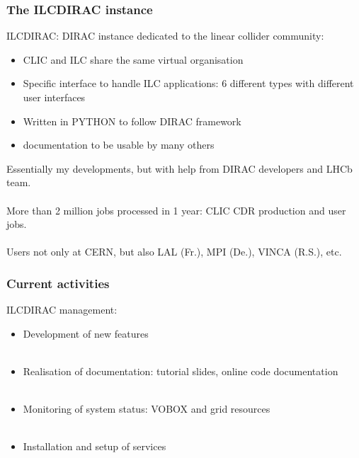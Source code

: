 \documentclass{beamer}
\begin{document}
{
 
\begin{frame}
\frametitle{The ILCDIRAC instance}
ILCDIRAC: DIRAC instance dedicated to the {\color{blue}linear collider
community}:
\begin{itemize}
  \item CLIC and ILC share the same virtual organisation
  \item \alert{Specific interface} to handle ILC applications: 6
different types with different user interfaces
\item Written in {\color{blue}PYTHON} to follow DIRAC framework
\item \alert{documentation} to be usable by many others
\end{itemize}
Essentially my developments, but with help from DIRAC developers and LHCb
team. \\
~\\
More than {\color{blue}2 million jobs processed in 1 year}: CLIC CDR
production and user jobs.\\
~\\ 
Users not only at CERN, but also LAL (Fr.), MPI (De.), VINCA (R.S.),
etc.
\end{frame}

\begin{frame}
\frametitle{Current activities}
ILCDIRAC management:\\
\begin{itemize}
  \item Development of \alert{new features}~\\ ~\\
  \item Realisation of \alert{documentation}: tutorial slides, online code
  documentation~\\ ~\\
  \item \alert{Monitoring} of system status: VOBOX and grid resources~\\ ~\\
  \item {\color{blue}Installation and setup} of services
\end{itemize}
\end{frame}
}
\end{document}

